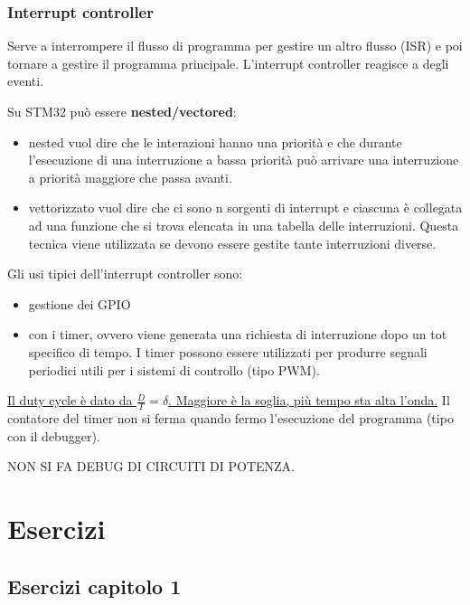 \documentclass[
]{book}
\providecommand{\tightlist}{%
  \setlength{\itemsep}{0pt}\setlength{\parskip}{0pt}}
\begin{document}
\subsection{Interrupt controller}\label{interrupt-controller}

Serve a interrompere il flusso di programma per gestire un altro flusso
(ISR) e poi tornare a gestire il programma principale. L'interrupt
controller reagisce a degli eventi.

Su STM32 può essere \textbf{nested/vectored}:

\begin{itemize}
\tightlist
\item
  nested vuol dire che le interazioni hanno una priorità e che durante
  l'esecuzione di una interruzione a bassa priorità può arrivare una
  interruzione a priorità maggiore che passa avanti.\\
\item
  vettorizzato vuol dire che ci sono n sorgenti di interrupt e ciascuna
  è collegata ad una funzione che si trova elencata in una tabella delle
  interruzioni. Questa tecnica viene utilizzata se devono essere gestite
  tante interruzioni diverse.
\end{itemize}

Gli usi tipici dell'interrupt controller sono:

\begin{itemize}
\tightlist
\item
  gestione dei GPIO
\item
  con i timer, ovvero viene generata una richiesta di interruzione dopo
  un tot specifico di tempo. I timer possono essere utilizzati per
  produrre segnali periodici utili per i sistemi di controllo (tipo
  PWM).
\end{itemize}

\href{immagini/51.png}{Il duty cycle è dato da \(\frac{D}{T}=\delta\).
Maggiore è la soglia, più tempo sta alta l'onda.} Il contatore del timer
non si ferma quando fermo l'esecuzione del programma (tipo con il
debugger).

NON SI FA DEBUG DI CIRCUITI DI POTENZA.

\appendix

\chapter{Esercizi}\label{esercizi}

\section{Esercizi capitolo 1}\label{esercizi-capitolo-1}
\end{document}
